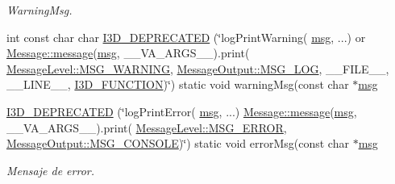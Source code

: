 \begin{DoxyCompactItemize}
\begin{DoxyCompactList}\small\item\em Warning\+Msg. \end{DoxyCompactList}\item 
int const char char \hyperlink{class_i3_d_1_1_log_msg_ab787c621ae0393e9fd5bdec3b2ebc02c}{I3\+D\+\_\+\+D\+E\+P\+R\+E\+C\+A\+T\+ED} (\char`\"{}log\+Print\+Warning( \hyperlink{class_i3_d_1_1_log_msg_a5a1ceb27d9529de8eb9b3fc9377e178a}{msg}, ...) or \hyperlink{class_i3_d_1_1_message_a525f877a41a1e7493188b2b720d1d254}{Message\+::message}(\hyperlink{class_i3_d_1_1_log_msg_a5a1ceb27d9529de8eb9b3fc9377e178a}{msg}, \+\_\+\+\_\+\+V\+A\+\_\+\+A\+R\+G\+S\+\_\+\+\_\+).print( \hyperlink{namespace_i3_d_a1c1740d2076e09b1a37b82e45a0327b5a124799373c019c5c7480f21a24104688}{Message\+Level\+::\+M\+S\+G\+\_\+\+W\+A\+R\+N\+I\+NG}, \hyperlink{namespace_i3_d_a2ccb65ac6e08844c1175a235107fa103a8c1a4761ebfadb227927517230ff7b02}{Message\+Output\+::\+M\+S\+G\+\_\+\+L\+OG}, \+\_\+\+\_\+\+F\+I\+L\+E\+\_\+\+\_\+, \+\_\+\+\_\+\+L\+I\+N\+E\+\_\+\+\_\+, \hyperlink{defs_8h_acd64dca6972802e8d77a78d3efcca04a}{I3\+D\+\_\+\+F\+U\+N\+C\+T\+I\+ON})\char`\"{}) static void warning\+Msg(const char $\ast$\hyperlink{class_i3_d_1_1_log_msg_a5a1ceb27d9529de8eb9b3fc9377e178a}{msg}
\item 
\hyperlink{class_i3_d_1_1_log_msg_a45ed30b4fc9701e6cc27d6eb9b197d35}{I3\+D\+\_\+\+D\+E\+P\+R\+E\+C\+A\+T\+ED} (\char`\"{}log\+Print\+Error( \hyperlink{class_i3_d_1_1_log_msg_a5a1ceb27d9529de8eb9b3fc9377e178a}{msg}, ...) \hyperlink{class_i3_d_1_1_message_a525f877a41a1e7493188b2b720d1d254}{Message\+::message}(\hyperlink{class_i3_d_1_1_log_msg_a5a1ceb27d9529de8eb9b3fc9377e178a}{msg}, \+\_\+\+\_\+\+V\+A\+\_\+\+A\+R\+G\+S\+\_\+\+\_\+).print( \hyperlink{namespace_i3_d_a1c1740d2076e09b1a37b82e45a0327b5a5c89a276ac7877e1de49cdc1b4750ce4}{Message\+Level\+::\+M\+S\+G\+\_\+\+E\+R\+R\+OR}, \hyperlink{namespace_i3_d_a2ccb65ac6e08844c1175a235107fa103ace1cd665ada8b4f22dfa5f764fed6c6c}{Message\+Output\+::\+M\+S\+G\+\_\+\+C\+O\+N\+S\+O\+LE})\char`\"{}) static void error\+Msg(const char $\ast$\hyperlink{class_i3_d_1_1_log_msg_a5a1ceb27d9529de8eb9b3fc9377e178a}{msg}
\begin{DoxyCompactList}\small\item\em Mensaje de error. \end{DoxyCompactList}\item 

\end{DoxyCompactItemize}
